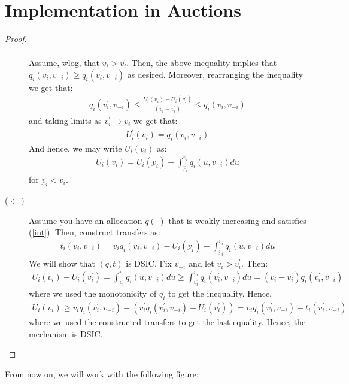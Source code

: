 \documentclass{article}
\newcommand{\enterProblemHeader}[1]{
\nobreak\extramarks{#1}{#1 continued on next page\ldots}\nobreak
\nobreak\extramarks{#1 (continued)}{#1 continued on next page\ldots}\nobreak
}
\newcommand{\exitProblemHeader}[1]{
\nobreak\extramarks{#1 (continued)}{#1 continued on next page\ldots}\nobreak
\nobreak\extramarks{#1}{}\nobreak
}
\newcounter{homeworkProblemCounter} %
\newcommand{\homeworkProblemName}{}
\newenvironment{ex}[1][Problem \arabic{homeworkProblemCounter}]{ %
\stepcounter{homeworkProblemCounter} %
\renewcommand{\homeworkProblemName}{#1} %
\section{\homeworkProblemName} %
}{
}
\begin{document}
\begin{ex}[Implementation in Auctions]
\begin{proof}
\begin{description}
\begin{eqnarray}
			\end{eqnarray}
			Assume, wlog, that $v_i>v_i^{'}$. Then, the above inequality implies that $q_i(v_i,v_{-i})\geq q_i(v_i^{'},v_{-i})$ as desired. Moreover, rearranging the inequality we get that:
			\begin{eqnarray}
			q_i(v_i^{'},v_{-i})\leq \frac{U_i(v_i)-U_{i}(v_i^{'})}{(v_i-v_{i}^{'})}\leq q_i(v_i,v_{-i})
			\end{eqnarray}
			and taking limits as $v_{i}^{'}\rightarrow v_i$ we get that:
			\begin{eqnarray}
			U_i^{'}(v_i)= q_i(v_i,v_{-i})
			\end{eqnarray}
			And hence, we may write $U_i(v_i)$ as:
			\begin{eqnarray}
			U_{i}(v_i)=U_i(\underbar{v}_{i})+\int_{\underbar{v}_{i}}^{v_i}q_{i}(u,v_{-i})du
			\end{eqnarray}
			for $\underbar{v}_i<v_i$.
			\item [($\Leftarrow$)] Assume you have an allocation $q(\cdot)$ that is weakly increasing and satisfies (\ref{int}). Then, construct transfers as:
			\begin{eqnarray}
			t_i(v_i,v_{-i})=v_iq_i(v_i,v_{-i})-U_i(\underbar{v}_{i})-\int_{\underbar{v}_{i}}^{v_i}q_{i}(u,v_{-i})du
			\end{eqnarray}
			We will show that $(q,t)$ is DSIC. Fix $v_{-i}$ and let $v_i>v_{i}^{'}$. Then:
			\begin{eqnarray}
			U_i(v_i)-U_{i}(v_i^{'})= \int_{v^{'}_{i}}^{v_i}q_{i}(u,v_{-i})du\geq \int_{v^{'}_{i}}^{v_i}q_{i}(v_{i}^{'},v_{-i})du=(v_i-v_i^{'})q_i(v_i^{'},v_{-i})
			\end{eqnarray}
			where we used the monotonicity of $q_i$ to get the inequality. Hence,
			\begin{eqnarray}
			U_i(v_i)\geq v_iq_i(v_i^{'},v_{-i})-(v_i^{'}q_i(v_i^{'},v_{-i})-U_i(v_i^{'}))=v_iq_i(v_i^{'},v_{-i})-t_i(v_i^{'},v_{-i})
			\end{eqnarray}
			where we used the constructed transfers to get the last equality. Hence, the mechanism is DSIC.
		\end{description}
	\end{proof}
	From now on, we will work 	with the following figure:
	\begin{center}
		\begin{figure}[htbp]

\end{figure}
\end{center}
\end{ex}
\end{document}
